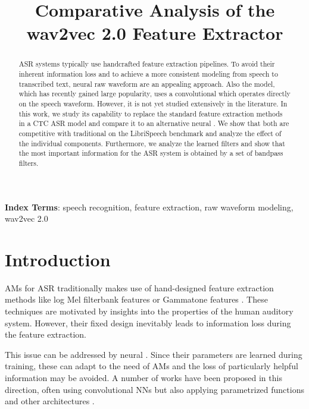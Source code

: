 \documentclass{INTERSPEECH2023}
\title{Comparative Analysis of the wav2vec 2.0 Feature Extractor}
\begin{document}
\maketitle
 
\begin{abstract}
\Gls{ASR} systems typically use handcrafted feature extraction pipelines.
To avoid their inherent information loss and to achieve a more consistent modeling from speech to transcribed text, neural raw waveform \fes are an appealing approach.
Also the \wvtwo model, which has recently gained large popularity, uses a convolutional \fe which operates directly on the speech waveform.
However, it is not yet studied extensively in the literature.
In this work, we study its capability to replace the standard feature extraction methods in a \gls{CTC} \gls{ASR} model and compare it to an alternative neural \fe.
We show that both are competitive with traditional \fes on the LibriSpeech benchmark and analyze the effect of the individual components.
Furthermore, we analyze the learned filters and show that the most important information for the \gls{ASR} system is obtained by a set of bandpass filters.
\end{abstract}
\noindent\textbf{Index Terms}: speech recognition, feature extraction, raw waveform modeling, wav2vec 2.0

\glsresetall

\section{Introduction}
\glspl{AM} for \gls{ASR} traditionally makes use of hand-designed feature extraction methods like log Mel filterbank features or Gammatone features \cite{schlueter:icassp07}.
These techniques are motivated by insights into the properties of the human auditory system.
However, their fixed design inevitably leads to information loss during the feature extraction.

This issue can be addressed by neural \fes.
Since their parameters are learned during training, these \fes can adapt to the need of \glspl{AM} and the loss of particularly helpful information may be avoided.
A number of works have been proposed in this direction, often using convolutional \glspl{NN} \cite{palaz2015convolutional, golik15:cnn, tuske2018:waveform} but also applying parametrized functions \cite{ravanelli2018sincnet} and other architectures \cite{sainath2015cldnn}.
\end{document}
